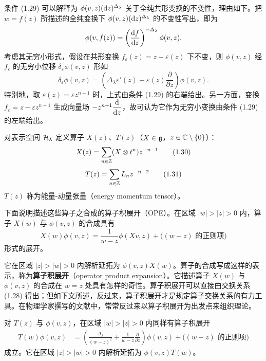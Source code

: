 条件 (1.29) 可以解释为 $\phi(v,z)(\mathrm{d} z)^{\Delta_\lambda}$ 关于全纯共形变换的不变性，理由如下。把 $w=f(z)$ 所描述的全纯变换下 $\phi(v,z)(\mathrm{d} z)^{\Delta_\lambda}$ 的不变性写出，即为
\[
\phi(v,f(z))=\left(\frac{\mathrm{d} f}{\mathrm{d} z}\right)^{-\Delta_\lambda}\phi(v,z).
\]
考虑其无穷小形式，假设在共形变换 $f_\varepsilon(z)=z-\varepsilon(z)$ 下不变，则 $\phi(v,z)$ 经 $f_\varepsilon$ 的无穷小位移 $\delta_\varepsilon\phi(v,z)$ 形如
\[
\delta_\varepsilon\phi(v,z)=\left(\Delta_\lambda\varepsilon'(z)+\varepsilon(z)\frac{\partial}{\partial z}\right)\phi(v,z).
\]
特别地，取 $\varepsilon(z)=\varepsilon z^{n+1}$ 时，上式由条件 (1.29) 的右端给出。另一方面，变换 $f_\varepsilon=z-\varepsilon z^{n+1}$ 生成向量场 $-z^{n+1}\dfrac{\mathrm{d}}{\mathrm{d} z}$，故可认为它作为无穷小变换由条件 (1.29) 的左端给出。

对表示空间 $\mathcal{H}_\lambda$ 定义算子 $X(z)$、$T(z)$（$X\in\mathfrak{g}$，$z\in\mathbb{C}\setminus\{0\}$）：
\begin{equation}
  X(z)=\sum_{n\in\mathbb{Z}}(X\otimes t^n)z^{-n-1} \tag{1.30}
\end{equation}
\begin{equation}
  T(z)=\sum_{n\in\mathbb{Z}}L_n z^{-n-2} \tag{1.31}
\end{equation}
$T(z)$ 称为能量-动量张量（energy momentum tensor）。

下面说明描述这些算子之合成的算子积展开（OPE）。在区域 $|w|>|z|>0$ 内，算子 $X(w)$ 与 $\phi(v,z)$ 的合成具有
\begin{equation}
  X(w)\phi(v,z)=\frac{1}{w-z}\phi(Xv,z)+\bigl((w-z)\text{ 的正则项}\bigr) \tag{1.32}
\end{equation}
形式的展开。


它在区域 $|z|>|w|>0$ 内解析延拓为 $\phi(v,z)X(w)$。算子的合成写成这样的表示，称为\textbf{算子积展开}（operator product expansion）。它描述算子 $X(w)$ 与 $\phi(v,z)$ 的合成在 $w=z$ 处具有怎样的奇性。算子积展开可以直接由交换关系 (1.28) 得出；但如下文所述，反过来，算子积展开才是规定算子交换关系的有力工具。在物理学家撰写的文献中，常常反过来以算子积展开为出发点来组织理论。

对 $T(z)$ 与 $\phi(v,z)$，在区域 $|w|>|z|>0$ 内同样有算子积展开
\begin{equation}
\begin{aligned}
T(w)\phi(v,z)&=\left(\frac{\Delta_\lambda}{(w-z)^{2}}+\frac{1}{w-z}\frac{\partial}{\partial z}\right)\phi(v,z)
+\bigl((w-z)\text{ 的正则项}\bigr)
\end{aligned}
\tag{1.33}
\end{equation}
成立。它在区域 $|z|>|w|>0$ 内解析延拓为 $\phi(v,z)T(w)$。

